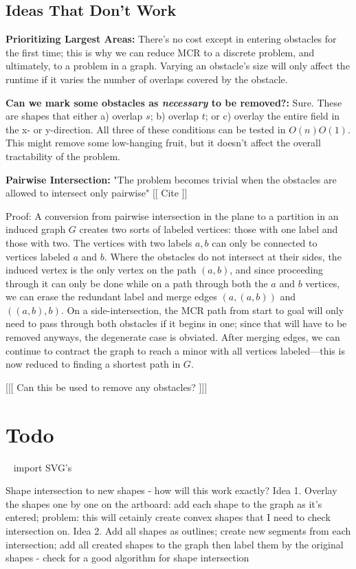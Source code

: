\documentclass{amsart}
\begin{document}
{\subsection{Ideas That Don't Work}

\textbf{Prioritizing Largest Areas:} There's no cost except in entering obstacles for the first time; this is why we can reduce MCR to a discrete problem, and ultimately, to a problem in a graph. Varying an obstacle's size will only affect the runtime if it varies the number of overlaps covered by the obstacle.

\textbf{Can we mark some obstacles as \emph{necessary} to be removed?:} Sure. These are shapes that either a) overlap $s$; b) overlap $t$; or c) overlay the entire field in the x- or y-direction. All three of these conditions can be tested in $O(n) O(1)$. This might remove some low-hanging fruit, but it doesn't affect the overall tractability of the problem.

\textbf{Pairwise Intersection:} "The problem becomes trivial when the obstacles are allowed to intersect only pairwise" [[ Cite ]]

Proof: A conversion from pairwise intersection in the plane to a partition in an induced graph $G$ creates two sorts of labeled vertices: those with one label and those with two. The vertices with two labels $a, b$ can only be connected to vertices labeled $a$ and $b$. Where the obstacles do not intersect at their sides, the induced vertex is the only vertex on the path $(a, b)$, and since proceeding through it can only be done while on a path through both the $a$ and $b$ vertices, we can erase the redundant label and merge edges $(a, (a, b))$ and $((a, b), b)$. On a side-intersection, the MCR path from start to goal will only need to pass through both obstacles if it begins in one; since that will have to be removed anyways, the degenerate case is obviated. After merging edges, we can continue to contract the graph to reach a minor with all vertices labeled---this is now reduced to finding a shortest path in $G$.


[[[ Can this be used to remove any obstacles? ]]]

\section{Todo}

~ import SVG's

Shape intersection to new shapes
    - how will this work exactly?
    Idea 1. Overlay the shapes one by one on the artboard: add each shape to the graph as it's entered; problem: this will cetainly create convex shapes that I need to check intersection on.
    Idea 2. Add all shapes as outlines; create new segments from each intersection; add all created shapes to the graph then label them by the original shapes
    - check for a good algorithm for shape intersection
    
}
\end{document}
